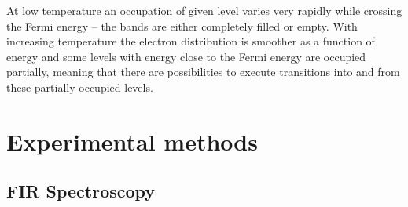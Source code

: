 \documentclass[titlepage,a4paper]{book}
\newcommand{\wciecie}{\quad\phantom{v}}
\begin{document}
At low temperature an occupation of given level varies very rapidly while crossing the Fermi energy -- the bands are either completely filled or empty. With increasing temperature the electron distribution is smoother as a function of energy and some levels with energy close to the Fermi energy are occupied partially, meaning that there are possibilities to execute  transitions into and from these partially occupied levels. 

\section{Experimental methods}
\subsection{FIR Spectroscopy}
\wciecie

\end{document}
